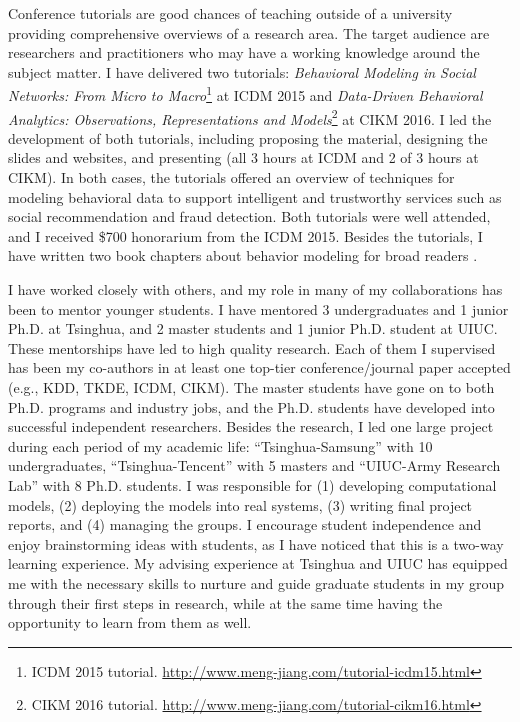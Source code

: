 \documentclass[10.5pt]{article}
\begin{document}
\vskip 0.04in
\vskip 0.02in

Conference tutorials are good chances of teaching outside of a university providing comprehensive overviews of a research area. The target audience are researchers and practitioners who may have a working knowledge around the subject matter. I have delivered two tutorials: \textit{Behavioral Modeling in Social Networks: From Micro to Macro}\footnote{ICDM 2015 tutorial. \url{http://www.meng-jiang.com/tutorial-icdm15.html}} \cite{jiang2015behavior} at ICDM 2015 and \textit{Data-Driven Behavioral Analytics: Observations, Representations and Models}\footnote{CIKM 2016 tutorial. \url{http://www.meng-jiang.com/tutorial-cikm16.html}} \cite{jiang2016data} at CIKM 2016. I led the development of both tutorials, including proposing the material, designing the slides and websites, and presenting (all 3 hours at ICDM and 2 of 3 hours at CIKM). In both cases, the tutorials offered an overview of techniques for modeling behavioral data to support intelligent and trustworthy services such as social recommendation and fraud detection. Both tutorials were well attended, and I received \$700 honorarium from the ICDM 2015. Besides the tutorials, I have written two book chapters about behavior modeling for broad readers \cite{jiang2016mining,jiang2016behavior}.

\vskip 0.06in
\vskip 0.02in

I have worked closely with others, and my role in many of my collaborations has been to mentor younger students. I have mentored 3 undergraduates and 1 junior Ph.D. at Tsinghua, and 2 master students and 1 junior Ph.D. student at UIUC. These mentorships have led to high quality research. Each of them I supervised has been my co-authors in at least one top-tier conference/journal paper accepted (e.g., KDD, TKDE, ICDM, CIKM). The master students have gone on to both Ph.D. programs and industry jobs, and the Ph.D. students have developed into successful independent researchers. Besides the research, I led one large project during each period of my academic life: ``Tsinghua-Samsung'' with 10 undergraduates, ``Tsinghua-Tencent'' with 5 masters and ``UIUC-Army Research Lab'' with 8 Ph.D. students. I was responsible for (1) developing computational models, (2) deploying the models into real systems, (3) writing final project reports, and (4) managing the groups. I encourage student independence and enjoy brainstorming ideas with students, as I have noticed that this is a two-way learning experience. My advising experience at Tsinghua and UIUC has equipped me with the necessary skills to nurture and guide graduate students in my group through their first steps in research, while at the same time having the opportunity to learn from them as well.
\end{document}
